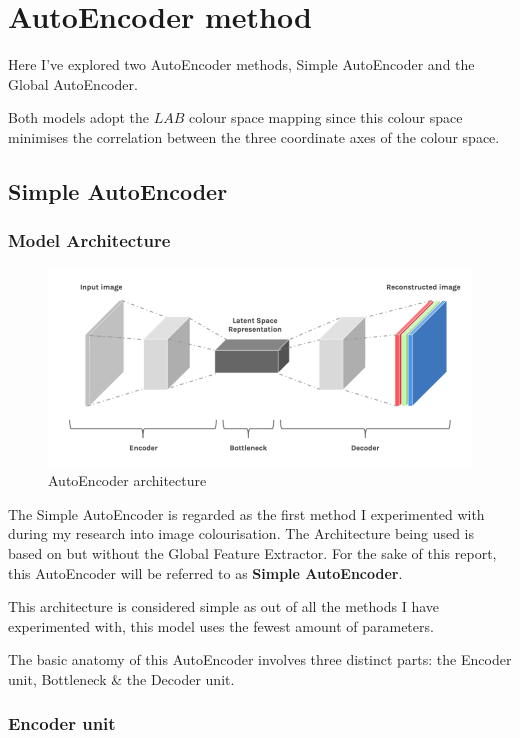 \pagebreak
\section{AutoEncoder method}
Here I've explored two AutoEncoder methods, Simple AutoEncoder and the Global AutoEncoder. 

Both models adopt the \(LAB\) colour space mapping since this colour space minimises the correlation between the three coordinate axes of the colour space.  




\subsection{Simple AutoEncoder}


\subsubsection*{Model Architecture}
\begin{figure}[H]
    \centering
    \includegraphics[width=0.7\columnwidth]{sections/figures/autoencoder.png}
    \caption{AutoEncoder architecture \cite{autoencoder2019}}
    \label{fig:my_label}
\end{figure}

The Simple AutoEncoder is regarded as the first method I experimented with during my research into image colourisation. The Architecture being used is based on \cite{IizukaSIGGRAPH2016} but without the Global Feature Extractor. For the sake of this report, this AutoEncoder will be referred to as \textbf{Simple AutoEncoder}.

This architecture is considered simple as out of all the methods I have experimented with, this model uses the fewest amount of parameters.

The basic anatomy of this AutoEncoder involves three distinct parts: the Encoder unit, Bottleneck \& the Decoder unit.

\subsubsection*{Encoder unit}

